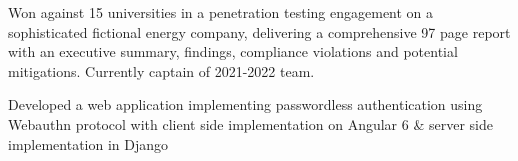 \documentclass[letterpaper]{deedy-resume} %
\begin{document}
\begin{minipage}[t]{0.66\textwidth}
\sectionspace %



Won against 15 universities in a penetration testing engagement on a sophisticated fictional energy company, delivering a comprehensive 97 page report with an executive summary, findings, compliance violations and potential mitigations. Currently captain of 2021-2022 team.

\sectionspace %


Developed a web application implementing passwordless authentication using Webauthn protocol with client side implementation on Angular 6 \& server side implementation in Django

\sectionspace %





\end{minipage}
\end{document}
